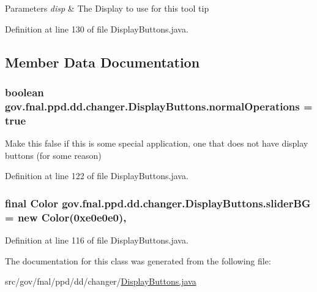 \begin{DoxyParams}{Parameters}
{\em disp} & The Display to use for this tool tip \\
\hline
\end{DoxyParams}


Definition at line 130 of file Display\-Buttons.\-java.



\subsection{Member Data Documentation}
\hypertarget{classgov_1_1fnal_1_1ppd_1_1dd_1_1changer_1_1DisplayButtons_aee30976132133400c5f8cb6a48599aa9}{
\subsubsection[{normal\-Operations}]{\setlength{\rightskip}{0pt plus 5cm}boolean gov.\-fnal.\-ppd.\-dd.\-changer.\-Display\-Buttons.\-normal\-Operations = true\hspace{0.3cm}{\ttfamily [static]}}}\label{classgov_1_1fnal_1_1ppd_1_1dd_1_1changer_1_1DisplayButtons_aee30976132133400c5f8cb6a48599aa9}
Make this false if this is some special application, one that does not have display buttons (for some reason) 

Definition at line 122 of file Display\-Buttons.\-java.

\hypertarget{classgov_1_1fnal_1_1ppd_1_1dd_1_1changer_1_1DisplayButtons_ab2b83431c13a58c3f26a01086ec4ac8d}{
\subsubsection[{slider\-B\-G}]{\setlength{\rightskip}{0pt plus 5cm}final Color gov.\-fnal.\-ppd.\-dd.\-changer.\-Display\-Buttons.\-slider\-B\-G = new Color(0xe0e0e0)\hspace{0.3cm}{\ttfamily [static]}, {\ttfamily [protected]}}}\label{classgov_1_1fnal_1_1ppd_1_1dd_1_1changer_1_1DisplayButtons_ab2b83431c13a58c3f26a01086ec4ac8d}


Definition at line 116 of file Display\-Buttons.\-java.



The documentation for this class was generated from the following file\-:\begin{DoxyCompactItemize}
\item 
src/gov/fnal/ppd/dd/changer/\hyperlink{DisplayButtons_8java}{Display\-Buttons.\-java}\end{DoxyCompactItemize}
